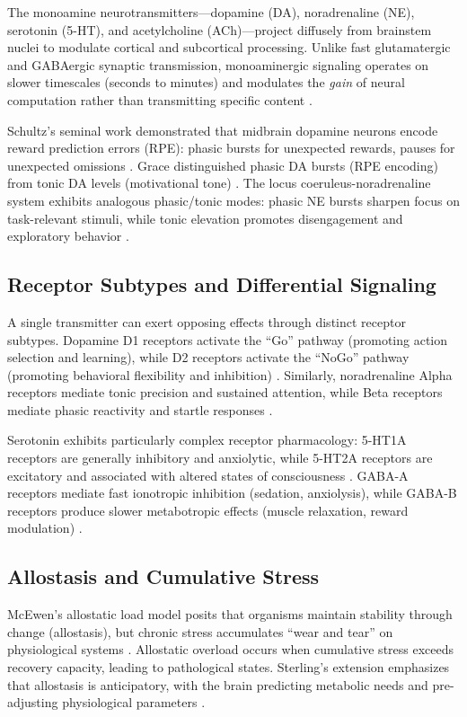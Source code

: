 \documentclass[11pt,a4paper]{article}
\begin{document}
The monoamine neurotransmitters---dopamine (DA), noradrenaline (NE), serotonin (5-HT), and acetylcholine (ACh)---project diffusely from brainstem nuclei to modulate cortical and subcortical processing. Unlike fast glutamatergic and GABAergic synaptic transmission, monoaminergic signaling operates on slower timescales (seconds to minutes) and modulates the \emph{gain} of neural computation rather than transmitting specific content \citep{servan1999}.

Schultz's seminal work demonstrated that midbrain dopamine neurons encode reward prediction errors (RPE): phasic bursts for unexpected rewards, pauses for unexpected omissions \citep{schultz1997}. Grace distinguished phasic DA bursts (RPE encoding) from tonic DA levels (motivational tone) \citep{grace1991}. The locus coeruleus-noradrenaline system exhibits analogous phasic/tonic modes: phasic NE bursts sharpen focus on task-relevant stimuli, while tonic elevation promotes disengagement and exploratory behavior \citep{aston-jones2005}.

\subsection{Receptor Subtypes and Differential Signaling}

A single transmitter can exert opposing effects through distinct receptor subtypes. Dopamine D1 receptors activate the ``Go'' pathway (promoting action selection and learning), while D2 receptors activate the ``NoGo'' pathway (promoting behavioral flexibility and inhibition) \citep{frank2005}. Similarly, noradrenaline Alpha receptors mediate tonic precision and sustained attention, while Beta receptors mediate phasic reactivity and startle responses \citep{arnsten2000}.

Serotonin exhibits particularly complex receptor pharmacology: 5-HT1A receptors are generally inhibitory and anxiolytic, while 5-HT2A receptors are excitatory and associated with altered states of consciousness \citep{carhart-harris2017}. GABA-A receptors mediate fast ionotropic inhibition (sedation, anxiolysis), while GABA-B receptors produce slower metabotropic effects (muscle relaxation, reward modulation) \citep{mohler2006}.

\subsection{Allostasis and Cumulative Stress}

McEwen's allostatic load model posits that organisms maintain stability through change (allostasis), but chronic stress accumulates ``wear and tear'' on physiological systems \citep{mcewen1998}. Allostatic overload occurs when cumulative stress exceeds recovery capacity, leading to pathological states. Sterling's extension emphasizes that allostasis is anticipatory, with the brain predicting metabolic needs and pre-adjusting physiological parameters \citep{sterling2012}.
\end{document}
